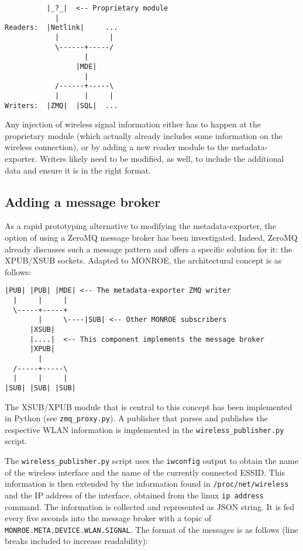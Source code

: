 \documentclass{scrartcl}
\begin{document}
\begin{verbatim}
          |_?_|  <-- Proprietary module
            |
Readers:  |Netlink|     ...
            |            |
            \------+-----/
                   |
                 |MDE|
                   |
            /------+-----\
            |      |     |
Writers:  |ZMQ|  |SQL|  ...
\end{verbatim}

Any injection of wireless signal information either has to happen at the
proprietary module (which actually already includes some information on the
wireless connection), or by adding a new reader module to the metadata-exporter.
Writers likely need to be modified, as well, to include the additional data and
ensure it is in the right format.

\subsection*{Adding a message broker}

As a rapid prototyping alternative to modifying the metadata-exporter, the
option of using a ZeroMQ message broker has been investigated. Indeed, ZeroMQ
already discusses such a message pattern and offers a specific solution for it:
the XPUB/XSUB sockets. Adapted to MONROE, the architectural concept is as
follows:

\begin{verbatim}
|PUB| |PUB| |MDE| <-- The metadata-exporter ZMQ writer
  |     |     |
  \-----+-----+
        |     \----|SUB| <-- Other MONROE subscribers
      |XSUB|
      |....|  <-- This component implements the message broker
      |XPUB|
        |
  /-----+-----\
  |     |     |
|SUB| |SUB| |SUB|
\end{verbatim}

The XSUB/XPUB module that is central to this concept has been implemented in
Python (see \verb#zmq_proxy.py#). A publisher that parses and publishes the
respective WLAN information is implemented in the \verb#wireless_publisher.py#
script.

The \verb#wireless_publisher.py# script uses the \verb#iwconfig# output to
obtain the name of the wireless interface and the name of the currently
connected ESSID\@.  This information is then extended by the information found in
\verb#/proc/net/wireless# and the IP address of the interface, obtained from
the linux \verb#ip address# command. The information is collected and
represented as JSON string. It is fed every five seconds into the message broker
with a topic of \verb#MONROE.META.DEVICE.WLAN.SIGNAL#. The format of the
messages is as follows (line breaks included to increase readability):
\end{document}
